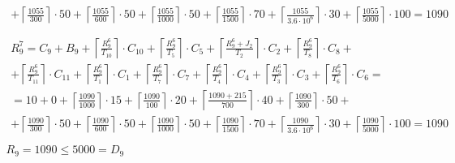 \begin{gather*}
\begin{multlined}
    + \left\lceil\frac{1055}{300}\right\rceil\cdot 50 + %
    \left\lceil\frac{1055}{600}\right\rceil\cdot 50 + %
    \left\lceil\frac{1055}{1000}\right\rceil\cdot 50 +%
    \left\lceil\frac{1055}{1500}\right\rceil\cdot 70 +%
    \left\lceil\frac{1055}{3.6 \cdot 10^6}\right\rceil\cdot 30 +%
    \left\lceil\frac{1055}{5000}\right\rceil\cdot 100 = 1090 \\
  \end{multlined} \\
  \begin{multlined}
    R_9^7 = C_9 + B_9 + \left\lceil\frac{R_9^6}{T_{10}}\right\rceil\cdot C_{10} + %
    \left\lceil\frac{R_9^6}{T_5}\right\rceil\cdot C_5 + %
    \left\lceil\frac{R_9^6 + J_2}{T_2}\right\rceil\cdot C_2 + %
    \left\lceil\frac{R_9^6}{T_8}\right\rceil\cdot C_8 + \\%
    + \left\lceil\frac{R_9^6}{T_{11}}\right\rceil\cdot C_{11} + %
    \left\lceil\frac{R_9^6}{T_1}\right\rceil\cdot C_1 +%
    \left\lceil\frac{R_9^6}{T_7}\right\rceil\cdot C_7 +%
    \left\lceil\frac{R_9^6}{T_4}\right\rceil\cdot C_4 +%
    \left\lceil\frac{R_9^6}{T_3}\right\rceil\cdot C_3 +%
    \left\lceil\frac{R_9^6}{T_6}\right\rceil\cdot C_6 = \\%
    = 10 + 0 + \left\lceil\frac{1090}{1000}\right\rceil\cdot 15 + %
    \left\lceil\frac{1090}{100}\right\rceil\cdot 20 + %
    \left\lceil\frac{1090 + 215}{700}\right\rceil\cdot 40 + %
    \left\lceil\frac{1090}{300}\right\rceil\cdot 50 + \\%
    + \left\lceil\frac{1090}{300}\right\rceil\cdot 50 + %
    \left\lceil\frac{1090}{600}\right\rceil\cdot 50 + %
    \left\lceil\frac{1090}{1000}\right\rceil\cdot 50 +%
    \left\lceil\frac{1090}{1500}\right\rceil\cdot 70 +%
    \left\lceil\frac{1090}{3.6 \cdot 10^6}\right\rceil\cdot 30 +%
    \left\lceil\frac{1090}{5000}\right\rceil\cdot 100 = 1090 \\
  \end{multlined} \\
  R_9 = 1090 \le 5000 = D_9
\end{gather*}
